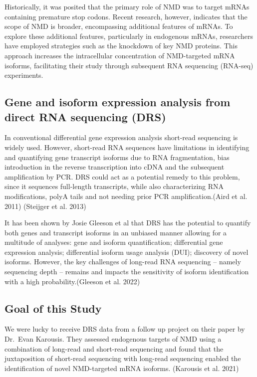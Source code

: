 \documentclass[
  letterpaper,
  DIV=11,
  numbers=noendperiod]{scrartcl}
\begin{document}
Historically, it was posited that the primary role of NMD was to target
mRNAs containing premature stop codons. Recent research, however,
indicates that the scope of NMD is broader, encompassing additional
features of mRNAs. To explore these additional features, particularly in
endogenous mRNAs, researchers have employed strategies such as the
knockdown of key NMD proteins. This approach increases the intracellular
concentration of NMD-targeted mRNA isoforms, facilitating their study
through subsequent RNA sequencing (RNA-seq) experiments.

\hypertarget{gene-and-isoform-expression-analysis-from-direct-rna-sequencing-drs}{%
\subsection{Gene and isoform expression analysis from direct RNA
sequencing
(DRS)}\label{gene-and-isoform-expression-analysis-from-direct-rna-sequencing-drs}}

In conventional differential gene expression analysis short-read
sequencing is widely used. However, short-read RNA sequences have
limitations in identifying and quantifying gene transcript isoforms due
to RNA fragmentation, bias introduction in the reverse transcription
into cDNA and the subsequent amplification by PCR. DRS could act as a
potential remedy to this problem, since it sequences full-length
transcripts, while also characterizing RNA modifications, polyA tails
and not needing prior PCR amplification.(Aird et al. 2011) (Steijger et
al. 2013)

It has been shown by Josie Gleeson et al that DRS has the potential to
quantify both genes and transcript isoforms in an unbiased manner
allowing for a multitude of analyses: gene and isoform quantification;
differential gene expression analysis; differential isoform usage
analysis (DUI); discovery of novel isoforms. However, the key challenges
of long-read RNA sequencing -- namely sequencing depth -- remains and
impacts the sensitivity of isoform identification with a high
probability.(Gleeson et al. 2022)

\hypertarget{goal-of-this-study}{%
\subsection{Goal of this Study}\label{goal-of-this-study}}

We were lucky to receive DRS data from a follow up project on their
paper by Dr.~Evan Karousis. They assessed endogenous targets of NMD
using a combination of long-read and short-read sequencing and found
that the juxtaposition of short-read sequencing with long-read
sequencing enabled the identification of novel NMD-targeted mRNA
isoforms. (Karousis et al. 2021)
\end{document}
